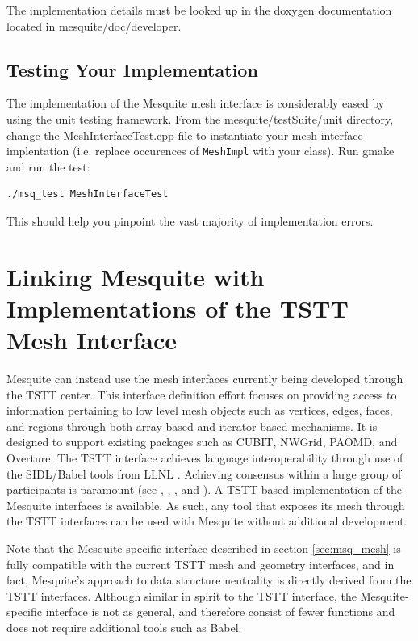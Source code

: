 \documentclass[letter]{report}
\begin{document}
The implementation details must be looked up in the doxygen documentation located in mesquite/doc/developer.

\subsection{Testing Your Implementation}

The implementation of the Mesquite mesh interface is considerably eased by using the unit testing
framework. From the mesquite/testSuite/unit directory, change the MeshInterfaceTest.cpp file to
instantiate your mesh interface implentation (i.e. replace occurences of \texttt{MeshImpl} with your
class). Run gmake and run the test:
\begin{verbatim} 
./msq_test MeshInterfaceTest
\end{verbatim} 
This should help you pinpoint the vast majority of implementation errors. 


\section{Linking Mesquite with Implementations of the TSTT Mesh Interface} 
\label{sec:TSTT}

Mesquite can instead use the mesh interfaces currently
being developed through the TSTT center.  This interface definition
effort focuses on providing access to information pertaining to low
level mesh objects such as vertices, edges, faces, and regions through
both array-based and iterator-based mechanisms.  It is designed to
support existing packages such as CUBIT, NWGrid, PAOMD, and Overture. 
The TSTT interface achieves language interoperability
through use of the SIDL/Babel tools from LLNL \cite{babel}.
Achieving consensus within a large group of participants is
paramount (see \cite{Cubit-website}, \cite{overture}, \cite{aomd-imr},
and \cite{NWGrid-website}).  
A TSTT-based implementation of the Mesquite
interfaces is available.  As such, any tool that exposes its
mesh through the TSTT interfaces can be used with Mesquite without
additional development.

Note that the Mesquite-specific interface described in section \ref{sec:msq_mesh} is fully compatible
with the current TSTT mesh and geometry interfaces, and in fact,
Mesquite's approach to data structure neutrality is directly derived
from the TSTT interfaces.  Although similar in spirit to the TSTT
interface, the Mesquite-specific interface is not as general, and 
therefore consist of fewer
functions and does not require additional tools such as Babel.
\end{document}
